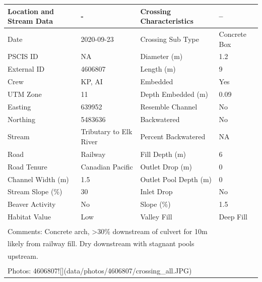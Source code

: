 \documentclass[
]{book}
\begin{document}
\begin{tabular}{llll}
\toprule
Location and Stream Data & - & Crossing Characteristics & --\\
\midrule
Date & 2020-09-23 & Crossing Sub Type & Concrete Box\\
PSCIS ID & NA & Diameter (m) & 1.2\\
External ID & 4606807 & Length (m) & 9\\
Crew & KP, AI & Embedded & Yes\\
UTM Zone & 11 & Depth Embedded (m) & 0.09\\
\addlinespace
Easting & 639952 & Resemble Channel & No\\
Northing & 5483636 & Backwatered & No\\
Stream & Tributary to Elk River & Percent Backwatered & NA\\
Road & Railway & Fill Depth (m) & 6\\
Road Tenure & Canadian Pacific & Outlet Drop (m) & 0\\
\addlinespace
Channel Width (m) & 1.5 & Outlet Pool Depth (m) & 0\\
Stream Slope (\%) & 30 & Inlet Drop & No\\
Beaver Activity & No & Slope (\%) & 1.5\\
Habitat Value & Low & Valley Fill & Deep Fill\\
\bottomrule
\multicolumn{4}{l}{\textsuperscript{} Comments: Concrete arch, >30\% downstream of culvert for 10m}\\
\multicolumn{4}{l}{likely from railway fill. Dry downstream with stagnant pools}\\
\multicolumn{4}{l}{upstream.}\\
\multicolumn{4}{l}{\textsuperscript{} Photos: 4606807![](data/photos/4606807/crossing\_all.JPG)}\\
\end{tabular}
\end{document}
